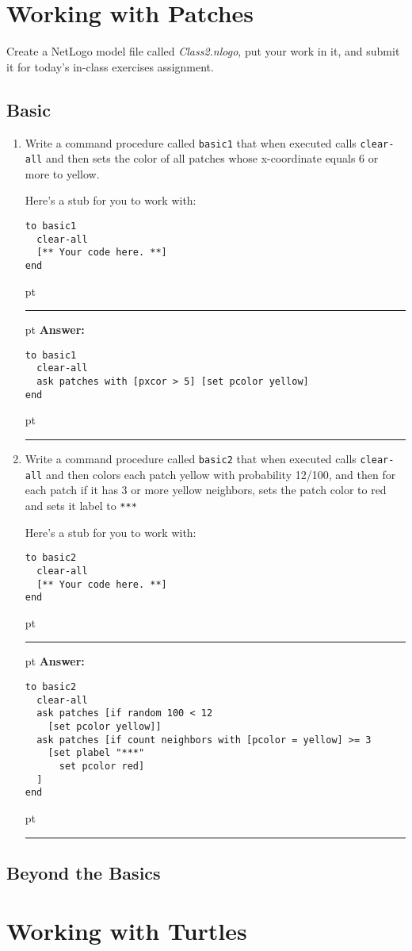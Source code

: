 \documentclass[11pt]{book}
\begin{document}
\chapter{Working with Patches}

Create a NetLogo model file called {\it Class2.nlogo}, put your work in it, and submit it for today's in-class exercises assignment.

\section{Basic}

\begin{enumerate}
\item Write a command procedure called \texttt{basic1} that when executed calls \texttt{clear-all} and then sets the color of all patches whose x-coordinate equals 6 or more to yellow. 

Here's a stub for you to work with:
\begin{verbatim}
to basic1
  clear-all
  [** Your code here. **]
end
\end{verbatim}


\ifnum{}
 pt
\hrule
{} pt
{\bf Answer: }
\begin{verbatim}
to basic1
  clear-all
  ask patches with [pxcor > 5] [set pcolor yellow]
end
\end{verbatim}
 pt
\hrule
\fi

\item Write a command procedure called \texttt{basic2} that when executed calls \texttt{clear-all} and then colors each patch yellow with probability 12/100, and then for each patch if it has 3 or more yellow neighbors, sets the patch color to red and sets it label to \texttt{***}

Here's a stub for you to work with:
\begin{verbatim}
to basic2
  clear-all
  [** Your code here. **]
end
\end{verbatim}

\ifnum{}
 pt
\hrule
{} pt
{\bf Answer: }
\begin{verbatim}
to basic2
  clear-all
  ask patches [if random 100 < 12
    [set pcolor yellow]]
  ask patches [if count neighbors with [pcolor = yellow] >= 3
    [set plabel "***"
      set pcolor red]
  ] 
end
\end{verbatim}
 pt
\hrule
\fi

\end{enumerate}

\section{Beyond the Basics}

\chapter{Working with Turtles}




%


%
\end{document}
